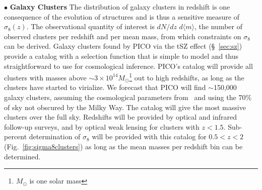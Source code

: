 \documentclass[PICOReport.tex]{subfiles}
\begin{document}
\noindent$\bullet$ {\bf Galaxy Clusters} \hspace{0.1in} \label{clusters}  
The distribution of galaxy clusters in redshift is one consequence of the evolution of structures and is thus a sensitive measure of $\sigma_{8}(z)$. The observational quantity of interest is $dN/dz \,\, d \langle m \rangle$, the number of observed clusters per redshift and per mean mass, from which constraints on $\sigma_{8}$ can be derived. Galaxy clusters found by PICO via the \ac{tSZ} effect (\S~\ref{sec:sz}) provide a catalog with a selection function that is simple to model and thus straightforward to use for cosmological inference. PICO's catalog will provide all clusters with masses above $\sim3\times10^{14} M_\odot$\footnote{$M_\odot$ is one solar mass}  out to high redshifts,  as long as the clusters have started to virialize. We forecast that PICO will find $\sim$150,000 galaxy clusters, assuming the cosmological parameters from \planck\  and using the 70\% of sky not obscured by the Milky Way. The catalog will give the most massive clusters over the full sky.  Redshifts will be provided by optical and infrared follow-up surveys, and by optical weak lensing for clusters with $z < 1.5$. Sub-percent determination of $\sigma_{8}$ will be provided with this catalog for $0.5 < z < 2$ (Fig.~\ref{fig:sigma8clusters}) as long as the mean masses per redshift bin can be determined.  

\end{document}
